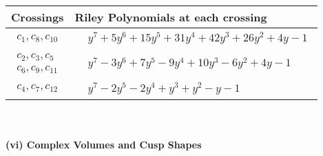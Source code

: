 \documentclass[1p]{elsarticle_modified}
\theoremstyle{definition}
\begin{document}
\begin{tabular}{m{50pt}|m{274pt}}
Crossings & \hspace{64pt}Riley Polynomials at each crossing \\
\hline $$\begin{aligned}c_{1},c_{8},c_{10}\end{aligned}$$&$\begin{aligned}
&y^7+5 y^6+15 y^5+31 y^4+42 y^3+26 y^2+4 y-1
\end{aligned}$\\
\hline $$\begin{aligned}c_{2},c_{3},c_{5}\\c_{6},c_{9},c_{11}\end{aligned}$$&$\begin{aligned}
&y^7-3 y^6+7 y^5-9 y^4+10 y^3-6 y^2+4 y-1
\end{aligned}$\\
\hline $$\begin{aligned}c_{4},c_{7},c_{12}\end{aligned}$$&$\begin{aligned}
&y^7-2 y^5-2 y^4+y^3+y^2- y-1
\end{aligned}$\\
\hline
\end{tabular}\\~\\
\newpage\flushleft \textbf{(vi) Complex Volumes and Cusp Shapes}
\end{document}
